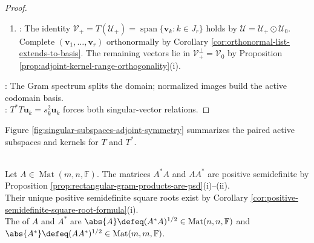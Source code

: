 \begin{theorem}
\begin{proof}
\begin{enumerate}[label=(\roman*)]
$(\forall k\in J_r)\,T\mathbf{u}_k=s_k\mathbf{v}_k$ and $T^*\mathbf{v}_k=s_k\mathbf{u}_k$ by the definitions of $\mathbf{v}_k$ and $G$.
\item {}: The identity $\mathcal{V}_+=T(\mathcal{U}_+)=\operatorname{span}\{\mathbf{v}_k:k\in J_r\}$ holds by $\mathcal{U}=\mathcal{U}_+\odot\mathcal{U}_0$.\\
Complete $(\mathbf{v}_1,\ldots,\mathbf{v}_r)$ orthonormally by Corollary \ref{cor:orthonormal-list-extends-to-basis}. The remaining vectors lie in $\mathcal{V}_+^\perp=\mathcal{V}_0$ by Proposition \ref{prop:adjoint-kernel-range-orthogonality}(i).
\end{enumerate}
: The Gram spectrum splits the domain; normalized images build the active codomain basis.\\
: $T^*T\mathbf{u}_k=s_k^2\mathbf{u}_k$ forces both singular-vector relations.
\end{proof}
\end{theorem}

Figure \ref{fig:singular-subspaces-adjoint-symmetry} summarizes the paired active subspaces and kernels for $T$ and $T^*$.

\begin{illustrationfigure}[H]
  \centering
  
  \caption{The singular-vector bases split the domain and codomain into active singular subspaces and kernels.}
  \label{fig:singular-subspaces-adjoint-symmetry}
\end{illustrationfigure}

\begin{definition} \label{def:matrix-modulus} \\
Let $A\in\operatorname{Mat}(m,n,\mathbb{F})$. The matrices $A^*A$ and $AA^*$ are positive semidefinite by Proposition \ref{prop:rectangular-gram-products-are-psd}(i)--(ii).\\
Their unique positive semidefinite square roots exist by Corollary \ref{cor:positive-semidefinite-square-root-formula}(i).\\
The  of $A$ and $A^*$ are $\abs{A}\defeq(A^*A)^{1/2}\in\operatorname{Mat}(n,n,\mathbb{F})$ and $\abs{A^*}\defeq(AA^*)^{1/2}\in\operatorname{Mat}(m,m,\mathbb{F})$.
\end{definition}

